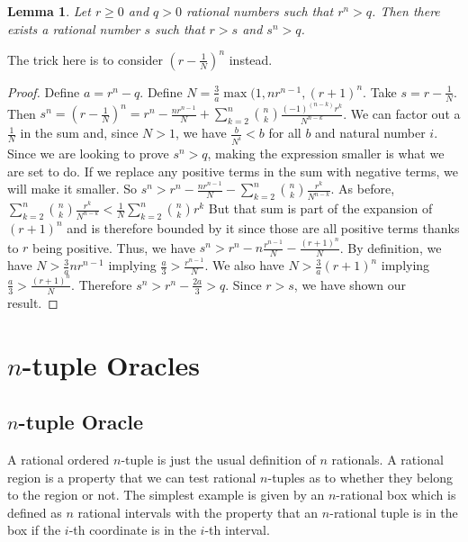 \documentclass[12pt]{article}
\newtheorem{lemma}{Lemma}
\theoremstyle{remark}
\begin{document}
\begin{lemma}\label{app:greater}
Let $r \geq 0 $ and $q > 0$ rational numbers such that $r^n > q$. Then there exists a rational number $s$ such that $r > s$ and $s^n > q$.
\end{lemma}

The trick here is to consider $(r-\tfrac{1}{N})^n$ instead. 

\begin{proof}
Define $a = r^n - q$. Define $N = \tfrac{3}{a} \max(1,n r^{n-1}, (r+1)^n$.  Take $s = r - \tfrac{1}{N}$. Then $s^n = (r- \tfrac{1}{N})^n = r^n - \tfrac{n r^{n-1}}{N} + \sum_{k=2}^{n} \binom{n}{k} \tfrac{ (-1)^(n-k) r^k}{N^{n-k}}$. We can factor out a $\tfrac{1}{N}$ in the sum and, since $N > 1$, we have $\tfrac{b}{N^i} < b$ for all $b$ and natural number $i$. Since we are looking to prove $s^n > q$, making the expression smaller is what we are set to do. If we replace any positive terms in the sum with negative terms, we will make it smaller. So $s^n > r^n - \tfrac{n r^{n-1}}{N} - \sum_{k=2}^{n} \binom{n}{k} \tfrac{r^k}{N^{n-k}}$. As before, $\sum_{k=2}^{n} \binom{n}{k} \tfrac{r^k}{N^{n-k}} < \tfrac{1}{N} \sum_{k=2}^{n} \binom{n}{k} r^k$  But that sum is part of the expansion of $(r+1)^n$ and is therefore bounded by it since those are all positive terms thanks to $r$ being positive. Thus, we have $s^n > r^n - n \tfrac{r^{n-1}}{N} - \tfrac{ (r+1)^n }{N}$.  By definition, we have $N > \tfrac{3}{a} n r^{n-1}$ implying $\tfrac{a}{3} > \tfrac{ r^{n-1}}{N}$. We also have $N > \tfrac{3}{a} (r+1)^n$ implying $\tfrac{a}{3} > \tfrac{(r+1)^n}{N}$. Therefore $s^n > r^n - \tfrac{2 a}{3} > q$. Since $r>s$, we have shown our result. 
\end{proof}

\section{$n$-tuple Oracles}

\subsection{$n$-tuple Oracle}

A rational ordered $n$-tuple is just the usual definition of $n$ rationals. A rational region is a property that we can test rational $n$-tuples as to whether they belong to the region or not. The simplest example is given by an $n$-rational box which is defined as $n$ rational intervals with the property that an $n$-rational tuple is in the box if the $i$-th coordinate is in the $i$-th interval. 
\end{document}
